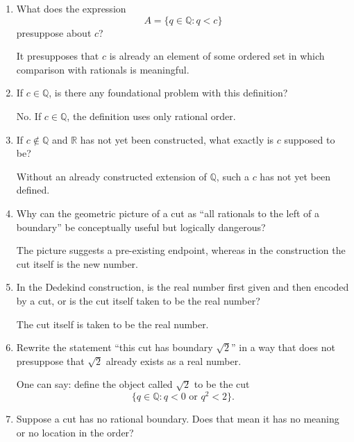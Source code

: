 \documentclass{self-check}
\begin{document}
\begin{enumerate}[label=\arabic{*}., itemsep=10pt]
  \item What does the expression
    \[ A=\{q\in\mathbb{Q}:q<c\} \]
    presuppose about \(c\)?

    \begin{answer}
      It presupposes that \(c\) is already an element of some ordered set in which comparison with rationals is meaningful.
    \end{answer}
  \item If \(c\in\mathbb{Q}\), is there any foundational problem with this definition?

    \begin{answer}
      No. If \(c\in\mathbb{Q}\), the definition uses only rational order.
    \end{answer}
  \item If \(c\notin\mathbb{Q}\) and \(\mathbb{R}\) has not yet been constructed, what exactly is \(c\) supposed to be?

    \begin{answer}
      Without an already constructed extension of \(\mathbb{Q}\), such a \(c\) has not yet been defined.
    \end{answer}
  \item Why can the geometric picture of a cut as ``all rationals to the left of a boundary'' be conceptually useful but logically dangerous?

    \begin{answer}
      The picture suggests a pre-existing endpoint, whereas in the construction the cut itself is the new number.
    \end{answer}
  \item In the Dedekind construction, is the real number first given and then encoded by a cut, or is the cut itself taken to be the real number?

    \begin{answer}
      The cut itself is taken to be the real number.
    \end{answer}
  \item Rewrite the statement ``this cut has boundary \(\sqrt{2}\)'' in a way that does not presuppose that \(\sqrt{2}\) already exists as a real number.

    \begin{answer}
      One can say: define the object called \(\sqrt{2}\) to be the cut
      \[ \{q\in\mathbb{Q}:q<0\text{ or }q^{2}<2\}. \]
    \end{answer}
  \item Suppose a cut has no rational boundary. Does that mean it has no meaning or no location in the order?


\end{enumerate}
\end{document}
